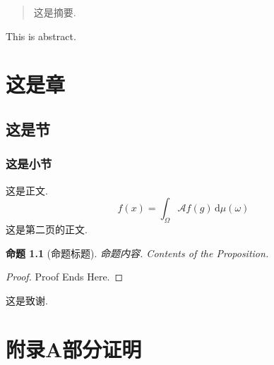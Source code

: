\documentclass[oneside]{fdmthesis2023}
\theoremstyle{definition}
\theoremstyle{plain}
\newtheorem{proposition}[definition]{命题}
\theoremstyle{remark}
\begin{document}
  \frontmatter
    \begin{abstract}
      这是摘要.
    \end{abstract}

    \begin{abstract*}
      This is abstract.
    \end{abstract*}

    \tableofcontents

  \mainmatter
    \chapter{这是章}
      \section{这是节}
        \subsection{这是小节}
          这是正文. \cite{key}
          $$
            f(x)=\int_{\Omega}\mathscr{A}f(g)\,\mathrm{d}\mu(\omega)
          $$
          \newpage
          这是第二页的正文.
          \begin{proposition}[命题标题]\kaiti
            命题内容. Contents of the Proposition.
          \end{proposition}
          \begin{proof}
            Proof Ends Here.
          \end{proof}

  \backmatter
    \begin{acknowledgement}
      这是致谢.
    \end{acknowledgement}

      
      

    \chapter*{附录A\quad 部分证明}
\end{document}
